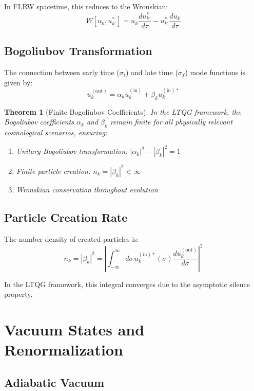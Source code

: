 \documentclass[11pt,a4paper]{article}
\newtheorem{theorem}{Theorem}[section]
\begin{document}
In FLRW spacetime, this reduces to the Wronskian:
\begin{equation}
W[u_k, u_{k'}^*] = u_k \frac{du_{k'}^*}{d\tau} - u_{k'}^* \frac{du_k}{d\tau}
\end{equation}

\subsection{Bogoliubov Transformation}

The connection between early time ($\sigma_i$) and late time ($\sigma_f$) mode functions is given by:
\begin{equation}
u_k^{(\text{out})} = \alpha_k u_k^{(\text{in})} + \beta_k u_k^{(\text{in})*}
\end{equation}

\begin{theorem}[Finite Bogoliubov Coefficients]
In the LTQG framework, the Bogoliubov coefficients $\alpha_k$ and $\beta_k$ remain finite for all physically relevant cosmological scenarios, ensuring:
\begin{enumerate}
\item Unitary Bogoliubov transformation: $|\alpha_k|^2 - |\beta_k|^2 = 1$
\item Finite particle creation: $n_k = |\beta_k|^2 < \infty$
\item Wronskian conservation throughout evolution
\end{enumerate}
\end{theorem}

\subsection{Particle Creation Rate}

The number density of created particles is:
\begin{equation}
n_k = |\beta_k|^2 = \left|\int_{-\infty}^{\infty} d\sigma \, u_k^{(\text{in})*}(\sigma) \frac{d u_k^{(\text{out})}}{d\sigma}\right|^2
\end{equation}

In the LTQG framework, this integral converges due to the asymptotic silence property.

\section{Vacuum States and Renormalization}

\subsection{Adiabatic Vacuum}
\end{document}
